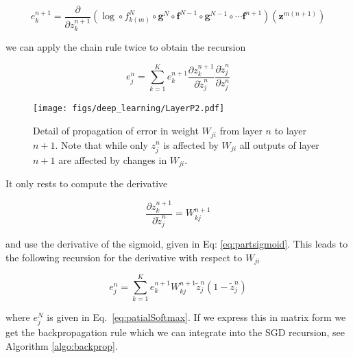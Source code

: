 \begin{equation}
e^{n+1}_k = \frac{\partial}{\partial z^{n+1}_{k}} (\log \circ f_{k(m)}^N \circ \mathbf{g}^N \circ \mathbf{f}^{N-1} \circ \mathbf{g}^{N-1} \circ \cdots \mathbf{f}^{n+1})(\mathbf{z}^{m(n+1)})
\end{equation}

\noindent we can apply the chain rule twice to obtain the
recursion\footnotemark{}

\begin{equation}
e^{n}_j = \sum_{k=1}^K e^{n+1}_k \frac{\partial z^{n+1}_k}{\partial \tilde{z}_{j}^n}\frac{\partial \tilde{z}^n_{j}}{\partial z_{j}^n} 
\label{eq:chainRulRecursion}
\end{equation}

\begin{figure}
\centering
\texttt{[image: figs/deep\_learning/LayerP2.pdf]}
\caption{Detail of propagation of error in weight $W_{ji}$ from layer $n$ to
layer $n+1$. Note that while only $z_j^n$ is affected by $W_{ji}$ all outputs
of layer $n+1$ are affected by changes in $W_{ji}$.}
\label{fig:LayerP2}
\end{figure}

\noindent It only rests to compute the derivative

\begin{equation}
\frac{\partial z^{n+1}_k}{\partial \tilde{z}_{j}^n} = W_{kj}^{n+1} 
\end{equation}

\noindent and use the derivative of the sigmoid, given in Eq:
\ref{eq:partsigmoid}. This leads to the following recursion for the derivative
with respect to $W_{ji}$

\begin{equation}
e^{n}_j = \sum_{k=1}^K e^{n+1}_k W_{kj}^{n+1}\tilde{z}^n_{j}(1-\tilde{z}^n_{j})
\end{equation}

\noindent where $e^{N}_j$ is given in Eq.~\ref{eq:patialSoftmax}. If we express this in matrix form we get the backpropagation rule which we can integrate into the SGD recursion, see Algorithm \ref{algo:backprop}. 

